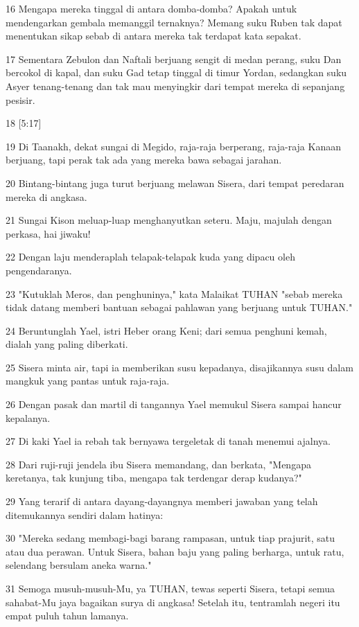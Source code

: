 \par 16 Mengapa mereka tinggal di antara domba-domba? Apakah untuk mendengarkan gembala memanggil ternaknya? Memang suku Ruben tak dapat menentukan sikap sebab di antara mereka tak terdapat kata sepakat.
\par 17 Sementara Zebulon dan Naftali berjuang sengit di medan perang, suku Dan bercokol di kapal, dan suku Gad tetap tinggal di timur Yordan, sedangkan suku Asyer tenang-tenang dan tak mau menyingkir dari tempat mereka di sepanjang pesisir.
\par 18 [5:17]
\par 19 Di Taanakh, dekat sungai di Megido, raja-raja berperang, raja-raja Kanaan berjuang, tapi perak tak ada yang mereka bawa sebagai jarahan.
\par 20 Bintang-bintang juga turut berjuang melawan Sisera, dari tempat peredaran mereka di angkasa.
\par 21 Sungai Kison meluap-luap menghanyutkan seteru. Maju, majulah dengan perkasa, hai jiwaku!
\par 22 Dengan laju menderaplah telapak-telapak kuda yang dipacu oleh pengendaranya.
\par 23 "Kutuklah Meros, dan penghuninya," kata Malaikat TUHAN "sebab mereka tidak datang memberi bantuan sebagai pahlawan yang berjuang untuk TUHAN."
\par 24 Beruntunglah Yael, istri Heber orang Keni; dari semua penghuni kemah, dialah yang paling diberkati.
\par 25 Sisera minta air, tapi ia memberikan susu kepadanya, disajikannya susu dalam mangkuk yang pantas untuk raja-raja.
\par 26 Dengan pasak dan martil di tangannya Yael memukul Sisera sampai hancur kepalanya.
\par 27 Di kaki Yael ia rebah tak bernyawa tergeletak di tanah menemui ajalnya.
\par 28 Dari ruji-ruji jendela ibu Sisera memandang, dan berkata, "Mengapa keretanya, tak kunjung tiba, mengapa tak terdengar derap kudanya?"
\par 29 Yang terarif di antara dayang-dayangnya memberi jawaban yang telah ditemukannya sendiri dalam hatinya:
\par 30 "Mereka sedang membagi-bagi barang rampasan, untuk tiap prajurit, satu atau dua perawan. Untuk Sisera, bahan baju yang paling berharga, untuk ratu, selendang bersulam aneka warna."
\par 31 Semoga musuh-musuh-Mu, ya TUHAN, tewas seperti Sisera, tetapi semua sahabat-Mu jaya bagaikan surya di angkasa! Setelah itu, tentramlah negeri itu empat puluh tahun lamanya.

